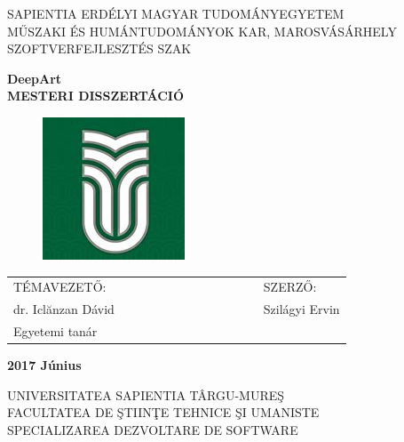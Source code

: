 \documentclass[12pt, a4paper, oneside]{book}
\theoremstyle{tetel}
\begin{document}

\newpage
\thispagestyle{empty}
\begin{center}
    \Large SAPIENTIA ERDÉLYI MAGYAR TUDOMÁNYEGYETEM\\
    \Large MŰSZAKI ÉS HUMÁNTUDOMÁNYOK KAR, MAROSVÁSÁRHELY\\
    \Large SZOFTVERFEJLESZTÉS SZAK\\
\end{center}

\begin{center}
 	\vspace{2cm}\LARGE \textbf{DeepArt}\\
	 \vspace{1cm}\LARGE \textbf{MESTERI DISSZERTÁCIÓ}\\
\end{center}

\vspace{2cm}
\begin{figure}[htb]
\hspace{5.7cm}\includegraphics[bb = 0 0 160 160]{sapi.jpg}
\end{figure}

\vspace{2cm}
\begin{center}
\begin{tabular}{lcccccccccccl}
    TÉMAVEZETŐ:&&&&&&& &&&&&SZERZŐ:\\
     dr. Iclănzan Dávid&&&&&& &&&&&&Szilágyi Ervin\\
	Egyetemi tanár
\end{tabular}
\end{center}

\begin{center}
    \vspace{0.5cm}\textbf{2017 Június}
\end{center}
\vspace*{\fill}
\newpage
\thispagestyle{empty}
\begin{center}
    \Large UNIVERSITATEA SAPIENTIA TÂRGU-MURE\c{S}\\
    \Large FACULTATEA DE \c{S}TIIN\c{T}E TEHNICE \c{S}I UMANISTE\\
    \Large SPECIALIZAREA DEZVOLTARE DE SOFTWARE\\
\end{center}
\end{document}
